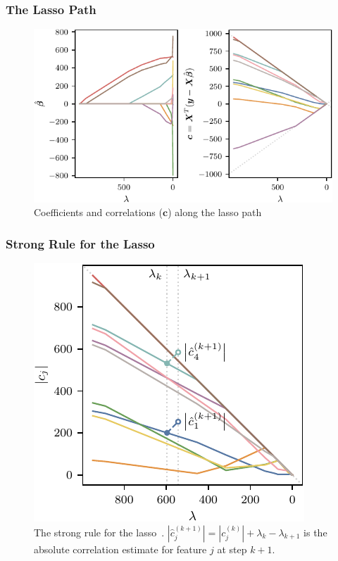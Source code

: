 \documentclass[10pt]{beamer}
\begin{document}
\begin{frame}[c]
  \frametitle{The Lasso Path}
  \begin{figure}[htpb]
    \centering
    \includegraphics[]{figures/paper1-cor-coef-lasso-path.pdf}
    \caption{%
      Coefficients and correlations (\(\bm{c}\)) along the lasso path
    }
  \end{figure}
\end{frame}

\begin{frame}[c]
  \frametitle{Strong Rule for the Lasso}

  \begin{figure}[htpb]
    \centering
    \includegraphics[]{figures/paper1-strong-rule.pdf}
    \caption{%
    The strong rule for the lasso~\parencite{tibshirani2012}. \(|\hat{c}_j^{(k+1)}| = |c_j^{(k)}| + \lambda_{k} - \lambda_{k+1} \) is the absolute correlation estimate for feature \(j\) at step \(k+1\).
    }
  \end{figure}
\end{frame}
\end{document}
